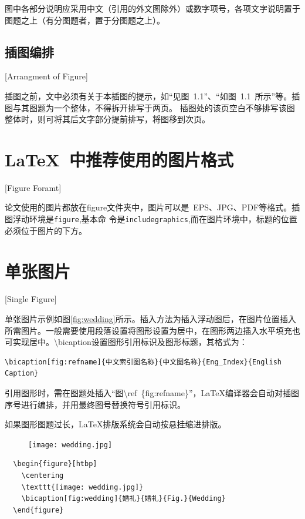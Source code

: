 图中各部分说明应采用中文（引用的外文图除外）或数字项号，各项文字说明置于图题之上（有分图题者，置于分图题之上）。

\subsection{插图编排}[Arrangment of Figure]

插图之前，文中必须有关于本插图的提示，如“见图~1.1”、“如图~1.1~所示”等。插图与其图题为一个整体，不得拆开排写于两页。
插图处的该页空白不够排写该图整体时，则可将其后文字部分提前排写，将图移到次页。

\section{LaTeX~中推荐使用的图片格式}[Figure Foramt]

论文使用的图片都放在figure文件夹中，图片可以是~EPS、JPG、PDF等格式。插图浮动环境是\texttt{figure},基本命
令是\texttt{includegraphics},而在图片环境中，标题的位置必须位于图片的下方。

\section{单张图片}[Single Figure]

单张图片示例如图\ref{fig:wedding}所示。插入方法为插入浮动图后，在图片位置插入所需图片。一般需要使用段落设置将图形设置为居中，在图形两边插入水平填充也可实现居中。\textbackslash bicaption设置图形引用标识及图形标题，其格式为：

\begin{lstlisting}
\bicaption[fig:refname]{中文索引图名称}{中文图名称}{Eng_Index}{English Caption}
\end{lstlisting}

引用图形时，需在图题处插入“图\textbackslash ref~\{fig:refname\}”，\LaTeX{}编译器会自动对插图序号进行编排，并用最终图号替换符号引用标识。

如果图形图题过长，\LaTeX{}排版系统会自动按悬挂缩进排版。

\begin{figure}[htbp]
  \centering
  \texttt{[image: wedding.jpg]}
\end{figure}

\begin{lstlisting}
  \begin{figure}[htbp]
    \centering
    \texttt{[image: wedding.jpg]}
    \bicaption[fig:wedding]{婚礼}{婚礼}{Fig.}{Wedding}
  \end{figure}
\end{lstlisting}

